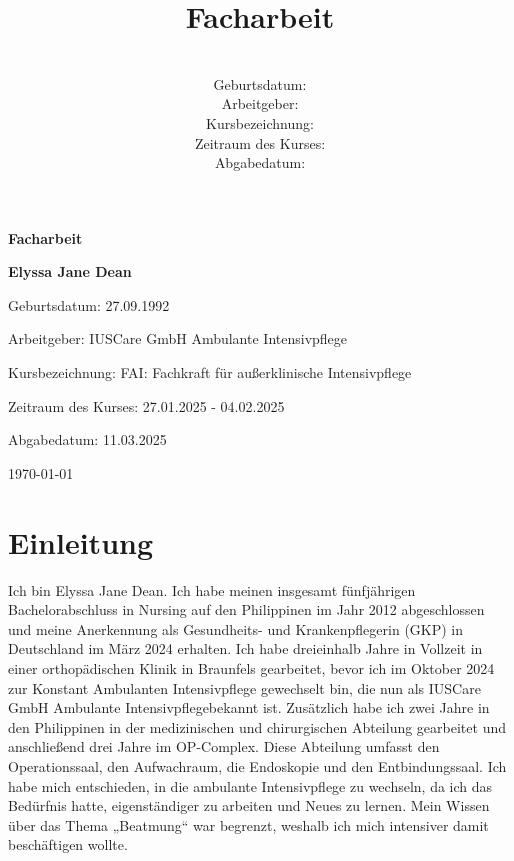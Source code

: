 \documentclass[a4paper,12pt]{article}
\title{\textbf{Facharbeit}}
\author{
    \autor \\
    Geburtsdatum: \geburtsdatum \\
    Arbeitgeber: \arbeitgeber \\
    Kursbezeichnung: \kursbezeichnung \\
    Zeitraum des Kurses: \kurszeitraum \\
    Abgabedatum: \abgabedatum
}
\date{}
\newcommand{\autor}{Elyssa Jane Dean}
\newcommand{\geburtsdatum}{27.09.1992}
\newcommand{\arbeitgeber}{IUSCare GmbH Ambulante Intensivpflege}
\newcommand{\kursbezeichnung}{FAI: Fachkraft für außerklinische Intensivpflege}
\newcommand{\kurszeitraum}{27.01.2025 - 04.02.2025}
\newcommand{\abgabedatum}{11.03.2025}
\begin{document}
\begin{titlepage}
	\centering
	\vspace*{2cm}
	\vspace{1cm}

	{\Huge \textbf{Facharbeit} \par}
	\vspace{1.5cm}

	{\Large \textbf{\autor} \par}
	\vspace{0.5cm}

	{\large Geburtsdatum: \geburtsdatum \par}
	\vspace{0.5cm}

	{\large Arbeitgeber: \arbeitgeber \par}
	\vspace{0.5cm}

	{\large Kursbezeichnung: \kursbezeichnung \par}
	\vspace{0.5cm}

	{\large Zeitraum des Kurses: \kurszeitraum \par}
	\vspace{0.5cm}

	{\large Abgabedatum: \abgabedatum \par}
	\vspace{2cm}

	\vfill
	{\large \today \par}
\end{titlepage}

\tableofcontents
\newpage

\section{Einleitung}
Ich bin \autor. Ich habe meinen insgesamt fünfjährigen
Bachelorabschluss in Nursing auf den Philippinen im Jahr 2012 abgeschlossen
und meine Anerkennung als Gesundheits- und Krankenpflegerin (GKP) in
Deutschland im März 2024 erhalten.
Ich habe dreieinhalb Jahre in Vollzeit in einer orthopädischen Klinik in
Braunfels gearbeitet, bevor ich im Oktober 2024 zur Konstant Ambulanten
Intensivpflege gewechselt bin, die nun als \arbeitgeber bekannt ist.
Zusätzlich habe ich zwei Jahre in den Philippinen in der medizinischen und
chirurgischen Abteilung gearbeitet und anschließend drei Jahre im OP-Complex.
Diese Abteilung umfasst den Operationssaal, den Aufwachraum, die Endoskopie
und den Entbindungssaal.
Ich habe mich entschieden, in die ambulante Intensivpflege zu wechseln, da ich
das Bedürfnis hatte, eigenständiger zu arbeiten und Neues zu lernen. Mein
Wissen über das Thema „Beatmung“ war begrenzt, weshalb ich mich intensiver
damit beschäftigen wollte.
\end{document}
